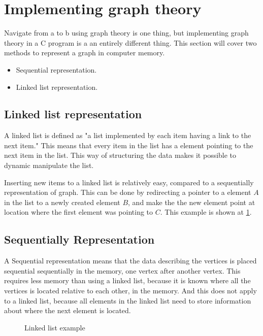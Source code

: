 \section{Implementing graph theory}

Navigate from a to b using graph theory is one thing, 
but implementing graph theory in a C program is a an entirely different thing. This section will cover two methods to represent a graph in computer memory. 

\begin{itemize}
	\item Sequential representation.
	\item Linked list representation.
\end{itemize} 

\subsection{Linked list representation}
A linked list is defined as "a list implemented by each item having a link to the next item."\cite{linked_list_def}
This means that every item in the list has a element pointing to the next item in the list. This way of structuring the data makes it possible to dynamic manipulate the list.\cite{Linked_List}

Inserting new items to a linked list is relatively easy, compared to a sequentially representation of graph. 
This can be done by redirecting a pointer to a element $A$ in the list to a newly created element $B$, and make the the new element point at location where the first element was pointing to $C$. This example is shown at \cref{fig:link}.

\subsection{Sequentially Representation}
A Sequential representation means that the data describing the vertices is placed sequential sequentially in the memory, one vertex after another vertex. 
This requires less memory than using a linked list, because it is known where all the vertices is located relative to each other, in the memory. And this does not apply to a linked list, because all elements in the linked list need to store information about where the next element is located.


\begin{figure}[h]
 \centering
{}
\caption{Linked list example} \label{fig:link}
\end{figure}

